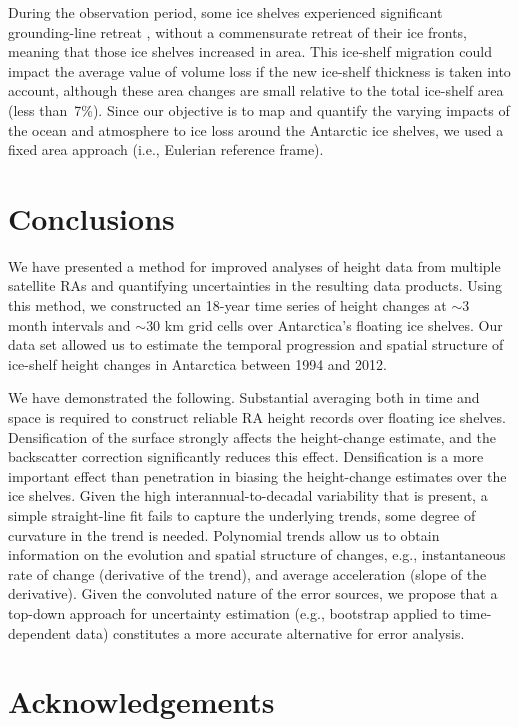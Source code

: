 During the observation period, some ice shelves experienced significant grounding-line retreat \parencite{Rignot2014}, without a commensurate retreat of their ice fronts, meaning that those ice shelves increased in area. This ice-shelf migration could impact the average value of volume loss if the new ice-shelf thickness is taken into account, although these area changes are small relative to the total ice-shelf area (less than~7\%). Since our objective is to map and quantify the varying impacts of the ocean and atmosphere to ice loss around the Antarctic ice shelves, we used a fixed area approach (i.e., Eulerian reference frame).

\section{Conclusions}

\noindent
We have presented a method for improved analyses of height data from multiple satellite RAs and quantifying uncertainties in the resulting data products. Using this method, we constructed an 18-year time series of height changes at $\sim$3 month intervals and $\sim$30 km grid cells over Antarctica's floating ice shelves. Our data set allowed us to estimate the temporal progression and spatial structure of ice-shelf height changes in Antarctica between 1994 and 2012.

We have demonstrated the following. Substantial averaging both in time and space is required to construct reliable RA height records over floating ice shelves. Densification of the surface strongly affects the height-change estimate, and the backscatter correction significantly reduces this effect. Densification is a more important effect than penetration in biasing the height-change estimates over the ice shelves. Given the high interannual-to-decadal variability that is present, a simple straight-line fit fails to capture the underlying trends, some degree of curvature in the trend is needed. Polynomial trends allow us to obtain information on the evolution and spatial structure of changes, e.g., instantaneous rate of change (derivative of the trend), and average acceleration (slope of the derivative). Given the convoluted nature of the error sources, we propose that a top-down approach for uncertainty estimation (e.g., bootstrap applied to time-dependent data) constitutes a more accurate alternative for error analysis.

\clearpage
\section*{Acknowledgements}

